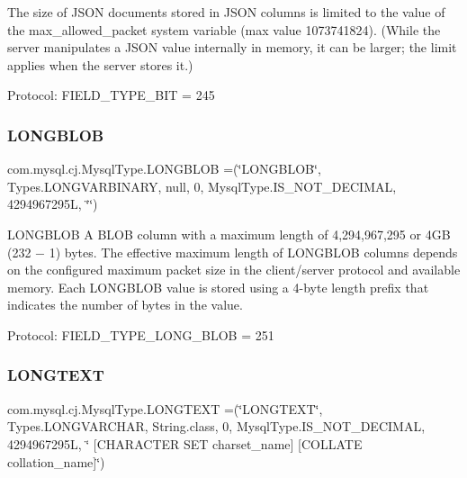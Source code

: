 The size of J\+S\+ON documents stored in J\+S\+ON columns is limited to the value of the max\+\_\+allowed\+\_\+packet system variable (max value 1073741824). (While the server manipulates a J\+S\+ON value internally in memory, it can be larger; the limit applies when the server stores it.)

Protocol\+: F\+I\+E\+L\+D\+\_\+\+T\+Y\+P\+E\+\_\+\+B\+IT = 245 \mbox{\label{enumcom_1_1mysql_1_1cj_1_1_mysql_type_ae25524b95c3afb1577b4e86a9b1f9fca}} 
\subsubsection{\texorpdfstring{L\+O\+N\+G\+B\+L\+OB}{LONGBLOB}}
{\footnotesize\ttfamily com.\+mysql.\+cj.\+Mysql\+Type.\+L\+O\+N\+G\+B\+L\+OB =(\char`\"{}L\+O\+N\+G\+B\+L\+OB\char`\"{}, Types.\+L\+O\+N\+G\+V\+A\+R\+B\+I\+N\+A\+RY, null, 0, Mysql\+Type.\+I\+S\+\_\+\+N\+O\+T\+\_\+\+D\+E\+C\+I\+M\+AL, 4294967295\+L, \char`\"{}\char`\"{})}

L\+O\+N\+G\+B\+L\+OB A B\+L\+OB column with a maximum length of 4,294,967,295 or 4\+GB (232 − 1) bytes. The effective maximum length of L\+O\+N\+G\+B\+L\+OB columns depends on the configured maximum packet size in the client/server protocol and available memory. Each L\+O\+N\+G\+B\+L\+OB value is stored using a 4-\/byte length prefix that indicates the number of bytes in the value.

Protocol\+: F\+I\+E\+L\+D\+\_\+\+T\+Y\+P\+E\+\_\+\+L\+O\+N\+G\+\_\+\+B\+L\+OB = 251 \mbox{\label{enumcom_1_1mysql_1_1cj_1_1_mysql_type_a2c64c15b3f4f30e58cf638130fa67a07}} 
\subsubsection{\texorpdfstring{L\+O\+N\+G\+T\+E\+XT}{LONGTEXT}}
{\footnotesize\ttfamily com.\+mysql.\+cj.\+Mysql\+Type.\+L\+O\+N\+G\+T\+E\+XT =(\char`\"{}L\+O\+N\+G\+T\+E\+XT\char`\"{}, Types.\+L\+O\+N\+G\+V\+A\+R\+C\+H\+AR, String.\+class, 0, Mysql\+Type.\+I\+S\+\_\+\+N\+O\+T\+\_\+\+D\+E\+C\+I\+M\+AL, 4294967295\+L, \char`\"{} \mbox{[}\+C\+H\+A\+R\+A\+C\+T\+E\+R S\+E\+T charset\+\_\+name\mbox{]} \mbox{[}\+C\+O\+L\+L\+A\+T\+E collation\+\_\+name\mbox{]}\char`\"{})}

